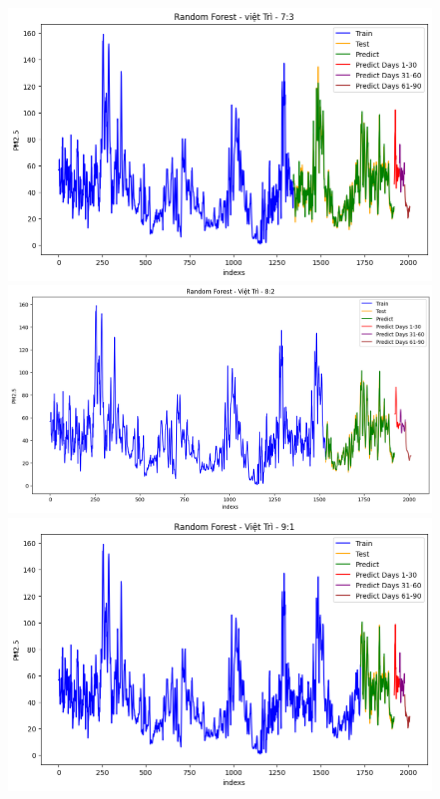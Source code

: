 \begin{figure}[H]
{\begin{adjustbox}{minipage=0.48\textwidth}
\begin{minipage}{0.3\textwidth}
            \end{minipage}\hfill
            \begin{minipage}{0.3\textwidth}
                \centering
                \includegraphics[width=\textwidth]{img/final/RF/90D/RF_7_3_VT.png}\\
                \includegraphics[width=\textwidth]{img/final/RF/90D/RF_8_2_VT.png}\\
                \includegraphics[width=\textwidth]{img/final/RF/90D/RF_9_1_VT.png}

\end{minipage}
\end{adjustbox}}
\end{figure}
